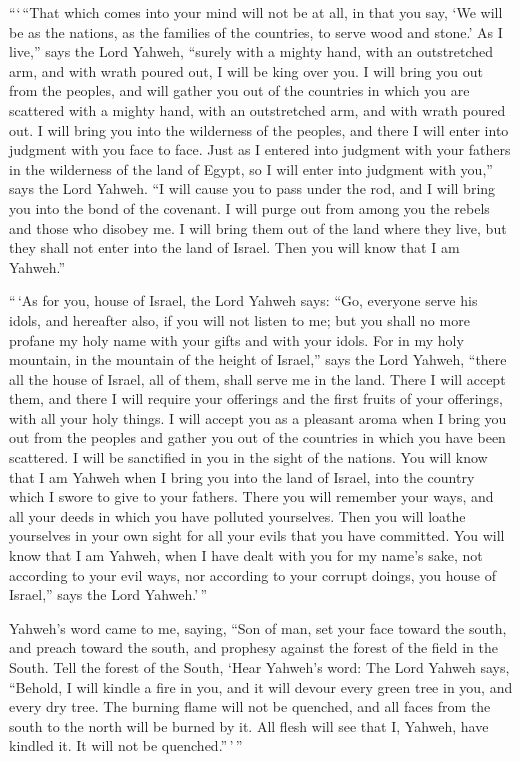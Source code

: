  ```\,``That which comes into your mind will not be at all,
in that you say, `We will be as the nations, as the families of the
countries, to serve wood and stone.'  As I live,'' says the
Lord Yahweh, ``surely with a mighty hand, with an outstretched arm, and
with wrath poured out, I will be king over you.  I will
bring you out from the peoples, and will gather you out of the countries
in which you are scattered with a mighty hand, with an outstretched arm,
and with wrath poured out.  I will bring you into the
wilderness of the peoples, and there I will enter into judgment with you
face to face.  Just as I entered into judgment with your
fathers in the wilderness of the land of Egypt, so I will enter into
judgment with you,'' says the Lord Yahweh.  ``I will cause
you to pass under the rod, and I will bring you into the bond of the
covenant.  I will purge out from among you the rebels and
those who disobey me. I will bring them out of the land where they live,
but they shall not enter into the land of Israel. Then you will know
that I am Yahweh.''

 ``\,`As for you, house of Israel, the Lord Yahweh says:
``Go, everyone serve his idols, and hereafter also, if you will not
listen to me; but you shall no more profane my holy name with your gifts
and with your idols.  For in my holy mountain, in the
mountain of the height of Israel,'' says the Lord Yahweh, ``there all
the house of Israel, all of them, shall serve me in the land. There I
will accept them, and there I will require your offerings and the first
fruits of your offerings, with all your holy things.  I
will accept you as a pleasant aroma when I bring you out from the
peoples and gather you out of the countries in which you have been
scattered. I will be sanctified in you in the sight of the nations.
 You will know that I am Yahweh when I bring you into the
land of Israel, into the country which I swore to give to your fathers.
 There you will remember your ways, and all your deeds in
which you have polluted yourselves. Then you will loathe yourselves in
your own sight for all your evils that you have committed. 
You will know that I am Yahweh, when I have dealt with you for my name's
sake, not according to your evil ways, nor according to your corrupt
doings, you house of Israel,'' says the Lord Yahweh.'\,''

 Yahweh's word came to me, saying,  ``Son of
man, set your face toward the south, and preach toward the south, and
prophesy against the forest of the field in the South. 
Tell the forest of the South, `Hear Yahweh's word: The Lord Yahweh says,
``Behold, I will kindle a fire in you, and it will devour every green
tree in you, and every dry tree. The burning flame will not be quenched,
and all faces from the south to the north will be burned by it.
 All flesh will see that I, Yahweh, have kindled it. It
will not be quenched.''\,'\,''


